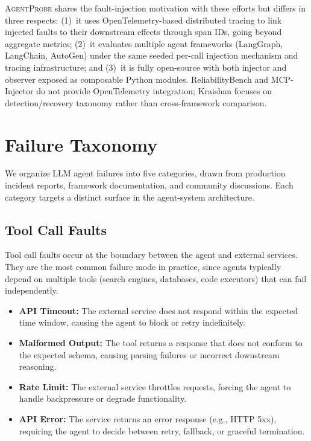 \documentclass[make,article,submit,moreauthors,pdftex]{mdpi}
\providecommand{\agentprobe}{\textsc{AgentProbe}}
\begin{document}
{\color{magenta}\agentprobe{} shares the fault-injection motivation with these efforts but differs in three respects: (1)~it uses OpenTelemetry-based distributed tracing to link injected faults to their downstream effects through span IDs, going beyond aggregate metrics; (2)~it evaluates multiple agent frameworks (LangGraph, LangChain, AutoGen) under the same seeded per-call injection mechanism and tracing infrastructure; and (3)~it is fully open-source with both injector and observer exposed as composable Python modules. ReliabilityBench and MCP-Injector do not provide OpenTelemetry integration; Kraishan focuses on detection/recovery taxonomy rather than cross-framework comparison.}


\section{Failure Taxonomy}\label{sec:taxonomy}

We organize LLM agent failures into five categories, drawn from production incident reports, framework documentation, and community discussions. Each category targets a distinct surface in the agent-system architecture.

\subsection{Tool Call Faults}

Tool call faults occur at the boundary between the agent and external services. They are the most common failure mode in practice, since agents typically depend on multiple tools (search engines, databases, code executors) that can fail independently.

\begin{itemize}
  \item \textbf{API Timeout:} The external service does not respond within the expected time window, causing the agent to block or retry indefinitely.
  \item \textbf{Malformed Output:} The tool returns a response that does not conform to the expected schema, causing parsing failures or incorrect downstream reasoning.
  \item \textbf{Rate Limit:} The external service throttles requests, forcing the agent to handle backpressure or degrade functionality.
  \item \textbf{API Error:} The service returns an error response (e.g., HTTP 5xx), requiring the agent to decide between retry, fallback, or graceful termination.
\end{itemize}
\end{document}
